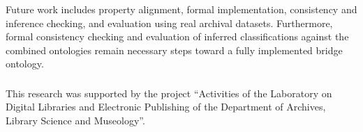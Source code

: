 \documentclass[runningheads]{llncs}
\begin{document}
Future work includes property alignment, formal implementation,
consistency and inference checking, and evaluation using
real archival datasets. Furthermore, formal consistency checking and evaluation of inferred classifications against the combined ontologies remain necessary steps toward a fully implemented bridge ontology.
%
%
\begin{credits}
	\subsubsection{\ackname}
	This research was supported by the project ``Activities of the Laboratory on Digital
	Libraries and Electronic Publishing of the Department of Archives, Library Science
	and Museology''.
\end{credits}
 
 
\end{document}
